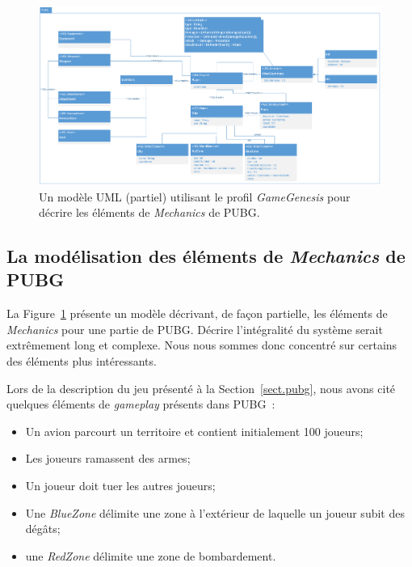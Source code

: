 \begin{landscape}
\begin{figure}
    \centering
    \includegraphics[width=\linewidth]{10_img/chap6/final_model.PNG}
    \caption{Un modèle UML (partiel) utilisant le profil \emph{GameGenesis} pour d\'ecrire les \'el\'ements de \emph{Mechanics} de PUBG.}
    \label{fig.PUBG_model}
\end{figure}
\end{landscape}



\subsection{La modélisation des \'el\'ements de \emph{Mechanics} de PUBG}

La Figure~\ref{fig.PUBG_model} présente un mod\`ele d\'ecrivant, de
fa\c{c}on partielle, les \'el\'ements de \emph{Mechanics} pour une
partie de PUBG.
%
 Décrire l'intégralité du système serait extrêmement long et complexe. Nous nous sommes donc concentré sur certains des \'el\'ements plus int\'eressants.


Lors de la description du jeu présenté à la Section~\ref{sect.pubg}, nous avons cité quelques éléments de \emph{gameplay} présents dans PUBG~: 
\begin{itemize}
    \item Un avion parcourt un territoire et contient initialement 100 joueurs;
    \item Les joueurs ramassent des armes;
    \item Un joueur doit tuer les autres joueurs;
    \item Une \emph{BlueZone} délimite une zone à l'extérieur de laquelle un joueur subit des dégâts;
    \item une \emph{RedZone} délimite une zone de bombardement.
\end{itemize}

